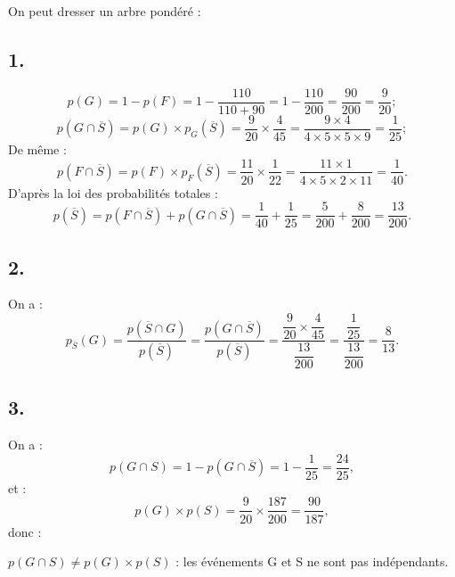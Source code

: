 On peut dresser un arbre pondéré :
\begin{center}
\end{center}

\subsection*{1.}

\[
p(G) = 1 - p(F) = 1 - \dfrac{110}{110 + 90} = 1 - \dfrac{110}{200} = \dfrac{90}{200} = \dfrac{9}{20};
\]
\[
p(G \cap \overline{S}) = p(G) \times p_G(\overline{S}) = \dfrac{9}{20} \times \dfrac{4}{45} = \dfrac{9 \times 4}{4 \times 5 \times 5 \times 9} = \dfrac{1}{25};
\]
De même :
\[
p(F \cap \overline{S}) = p(F) \times p_F(\overline{S}) = \dfrac{11}{20} \times \dfrac{1}{22} = \dfrac{11 \times 1}{4 \times 5 \times 2 \times 11} = \dfrac{1}{40}.
\]
D'après la loi des probabilités totales :
\[
p(\overline{S}) = p(F \cap \overline{S}) + p(G \cap \overline{S}) = \dfrac{1}{40} + \dfrac{1}{25} = \dfrac{5}{200} + \dfrac{8}{200} = \dfrac{13}{200}.
\]

\subsection*{2.}

On a :
\[
p_{\overline{S}}(G) = \dfrac{p(\overline{S} \cap G)}{p(\overline{S})} = \dfrac{p(G \cap \overline{S})}{p(\overline{S})} = \dfrac{\dfrac{9}{20} \times \dfrac{4}{45}}{\dfrac{13}{200}} = \dfrac{\dfrac{1}{25}}{\dfrac{13}{200}} = \dfrac{8}{13}.
\]

\subsection*{3.}

On a :
\[
p(G \cap S) = 1 - p(G \cap \overline{S}) = 1 - \dfrac{1}{25} = \dfrac{24}{25},
\]
et :
\[
p(G) \times p(S) = \dfrac{9}{20} \times \dfrac{187}{200} = \dfrac{90}{187},
\]
donc :

\(p(G \cap S) \neq p(G) \times p(S)\) : les événements G et S ne sont pas indépendants.
